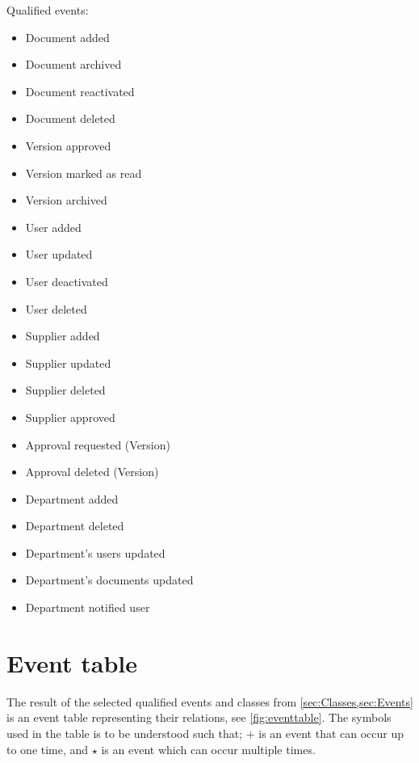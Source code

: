 Qualified events:
\begin{multicols}{2}
	\begin{itemize} 
	\item Document added
	\item Document archived
	\item Document reactivated
	\item Document deleted
	\item Version approved
	\item Version marked as read
	\item Version archived
	\item User added
	\item User updated
	\item User deactivated
	\item User deleted
	\item Supplier added
	\item Supplier updated
	\item Supplier deleted
	\item Supplier approved
	\item Approval requested (Version)
	\item Approval deleted (Version)
	\item Department added
	\item Department deleted
	\item Department's users updated
	\item Department's documents updated
	\item Department notified user
	\end{itemize}
\end{multicols}

\section{Event table}\label{sec:EventTable}
The result of the selected qualified events and classes from \cref{sec:Classes,sec:Events} is an event table representing their relations, see \cref{fig:eventtable}. 
The symbols used in the table is to be understood such that; $+$ is an event that can occur up to one time, and $\star$ is an event which can occur multiple times.

